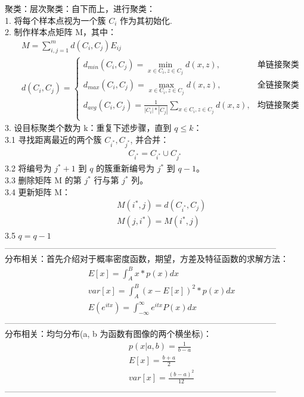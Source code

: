 \documentclass{article}
\begin{document}
\noindent 聚类：层次聚类：自下而上，进行聚类：\\
1. 将每个样本点视为一个簇 $C_{i}$ 作为其初始化.\\
2. 制作样本点矩阵 M，其中：
\begin{eqnarray*}
&&M = \sum_{i,j=1}^{m}d(C_{i}, C_{j})E_{ij}\\
&&d(C_{i}, C_{j}) = 
\begin{cases}
d_{min}(C_{i}, C_{j}) = \min_{x\in C_{i}, z\in C_{j}} d(x, z), & \text{单链接聚类}\\
d_{max}(C_{i}, C_{j}) = \max_{x\in C_{i}, z\in C_{j}} d(x, z), & \text{全链接聚类}\\
d_{avg}(C_{i}, C_{j}) = \frac{1}{|C_{i}|*|C_{j}|}\sum_{x\in C_{i}, z\in C_{j}}d(x, z), & \text{均链接聚类}\\
\end{cases}
\end{eqnarray*}
3. 设目标聚类个数为 k：重复下述步骤，直到 $q\leq k$：\\
3.1 寻找距离最近的两个簇 $C_{i^{*}}, C_{j^{*}}$, 并合并：
\begin{eqnarray*}
C_{i^{*}} = C_{i^{*}}\cup C_{j^{*}}
\end{eqnarray*}
3.2 将编号为 $j^{*} + 1$ 到 $q$ 的簇重新编号为 $j^{*}$ 到 $q-1$。\\
3.3 删除矩阵 M 的第 $j^{*}$ 行与第 $j^{*}$ 列。\\
3.4 更新矩阵 M：
\begin{eqnarray*}
&&M(i^{*}, j) = d(C_{i^{*}}, C_{j})\\
&&M(j, i^{*}) = M(i^{*}, j)
\end{eqnarray*}
3.5 $q = q-1$\\
--------------------------------------------------------------------------------------------------\\

\noindent 分布相关：首先介绍对于概率密度函数，期望，方差及特征函数的求解方法：
\begin{eqnarray*}
&&E[x] = \int_{A}^{B}x*p(x)dx\\
&&var[x] = \int_{A}^{B}(x-E[x])^{2}*p(x)dx\\
&&E(e^{itx})=\int_{-\infty}^{\infty}e^{itx}P(x)dx
\end{eqnarray*}
--------------------------------------------------------------------------------------------------\\

\noindent 分布相关：均匀分布(a, b 为函数有图像的两个横坐标)：\\
\begin{eqnarray*}
&&p(x|a,b) = \frac{1}{b-a}\\
&&E[x] = \frac{b+a}{2}\\
&&var[x] = \frac{(b-a)^{2}}{12}
\end{eqnarray*}
--------------------------------------------------------------------------------------------------\\
\end{document}
